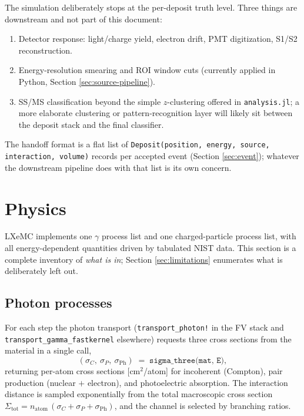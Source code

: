 \documentclass[11pt]{article}
\begin{document}
The simulation deliberately stops at the per-deposit truth level. Three things
are downstream and not part of this document:

\begin{enumerate}[label=(\alph*)]
\item Detector response: light/charge yield, electron drift, PMT
digitization, S1/S2 reconstruction.
\item Energy-resolution smearing and ROI window cuts (currently applied
in Python, Section \ref{sec:source-pipeline}).
\item SS/MS classification beyond the simple $z$-clustering offered in
\texttt{analysis.jl}; a more elaborate clustering or pattern-recognition layer
will likely sit between the deposit stack and the final classifier.
\end{enumerate}

The handoff format is a flat list of
\texttt{Deposit(position, energy, source, interaction, volume)} records per
accepted event (Section \ref{sec:event}); whatever the downstream pipeline
does with that list is its own concern.

\section{Physics}
\label{sec:physics}

LXeMC implements one $\gamma$ process list and one charged-particle process
list, with all energy-dependent quantities driven by tabulated NIST data.
This section is a complete inventory of \emph{what is in}; Section
\ref{sec:limitations} enumerates what is deliberately left out.

\subsection{Photon processes}
\label{sec:physics-photons}

For each step the photon transport (\texttt{transport\_photon!} in the FV stack
and \texttt{transport\_gamma\_fastkernel} elsewhere) requests three cross
sections from the material in a single call,
\begin{equation*}
(\sigma_C,\ \sigma_P,\ \sigma_{\mathrm{Ph}}) \;=\; \texttt{sigma\_three(mat, E)},
\end{equation*}
returning per-atom cross sections [cm$^2$/atom] for incoherent (Compton), pair
production (nuclear $+$ electron), and photoelectric absorption. The interaction
distance is sampled exponentially from the total macroscopic cross section
$\Sigma_{\mathrm{tot}} = n_{\mathrm{atom}}\,(\sigma_C + \sigma_P + \sigma_{\mathrm{Ph}})$,
and the channel is selected by branching ratios.
\end{document}
